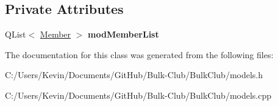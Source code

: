 \subsection*{Private Attributes}
\begin{DoxyCompactItemize}
\item 
\mbox{\label{class_member_model_ab6036ba08b309eac114c11712c98f948}} 
Q\+List$<$ \mbox{\hyperlink{class_member}{Member}} $>$ {\bfseries mod\+Member\+List}
\end{DoxyCompactItemize}


The documentation for this class was generated from the following files\+:\begin{DoxyCompactItemize}
\item 
C\+:/\+Users/\+Kevin/\+Documents/\+Git\+Hub/\+Bulk-\/\+Club/\+Bulk\+Club/models.\+h\item 
C\+:/\+Users/\+Kevin/\+Documents/\+Git\+Hub/\+Bulk-\/\+Club/\+Bulk\+Club/models.\+cpp\end{DoxyCompactItemize}
